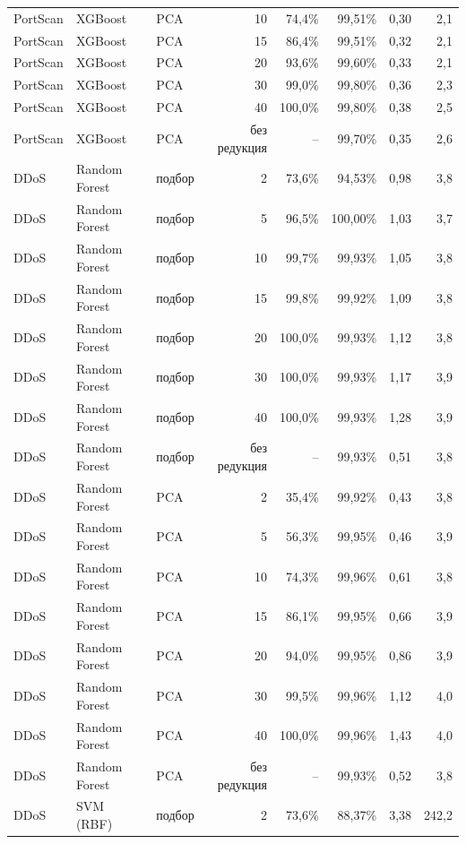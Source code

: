 {\begin{tabular}{@{}lllrrrrr@{}}
PortScan & XGBoost & PCA & 10 & 74,4\% & 99,51\% & 0,30 & 2,1\\
\rowcolor{rowalt}PortScan & XGBoost & PCA & 15 & 86,4\% & 99,51\% & 0,32 & 2,1\\
PortScan & XGBoost & PCA & 20 & 93,6\% & 99,60\% & 0,33 & 2,1\\
\rowcolor{rowalt}PortScan & XGBoost & PCA & 30 & 99,0\% & 99,80\% & 0,36 & 2,3\\
PortScan & XGBoost & PCA & 40 & 100,0\% & 99,80\% & 0,38 & 2,5\\
\rowcolor{rowalt}PortScan & XGBoost & PCA & без редукция & -- & 99,70\% & 0,35 & 2,6\\
DDoS & Random Forest & подбор & 2 & 73,6\% & 94,53\% & 0,98 & 3,8\\
\rowcolor{rowalt}DDoS & Random Forest & подбор & 5 & 96,5\% & 100,00\% & 1,03 & 3,7\\
DDoS & Random Forest & подбор & 10 & 99,7\% & 99,93\% & 1,05 & 3,8\\
\rowcolor{rowalt}DDoS & Random Forest & подбор & 15 & 99,8\% & 99,92\% & 1,09 & 3,8\\
DDoS & Random Forest & подбор & 20 & 100,0\% & 99,93\% & 1,12 & 3,8\\
\rowcolor{rowalt}DDoS & Random Forest & подбор & 30 & 100,0\% & 99,93\% & 1,17 & 3,9\\
DDoS & Random Forest & подбор & 40 & 100,0\% & 99,93\% & 1,28 & 3,9\\
\rowcolor{rowalt}DDoS & Random Forest & подбор & без редукция & -- & 99,93\% & 0,51 & 3,8\\
DDoS & Random Forest & PCA & 2 & 35,4\% & 99,92\% & 0,43 & 3,8\\
\rowcolor{rowalt}DDoS & Random Forest & PCA & 5 & 56,3\% & 99,95\% & 0,46 & 3,9\\
DDoS & Random Forest & PCA & 10 & 74,3\% & 99,96\% & 0,61 & 3,8\\
\rowcolor{rowalt}DDoS & Random Forest & PCA & 15 & 86,1\% & 99,95\% & 0,66 & 3,9\\
DDoS & Random Forest & PCA & 20 & 94,0\% & 99,95\% & 0,86 & 3,9\\
\rowcolor{rowalt}DDoS & Random Forest & PCA & 30 & 99,5\% & 99,96\% & 1,12 & 4,0\\
DDoS & Random Forest & PCA & 40 & 100,0\% & 99,96\% & 1,43 & 4,0\\
\rowcolor{rowalt}DDoS & Random Forest & PCA & без редукция & -- & 99,93\% & 0,52 & 3,8\\
DDoS & SVM (RBF) & подбор & 2 & 73,6\% & 88,37\% & 3,38 & 242,2\\

\end{tabular}}
